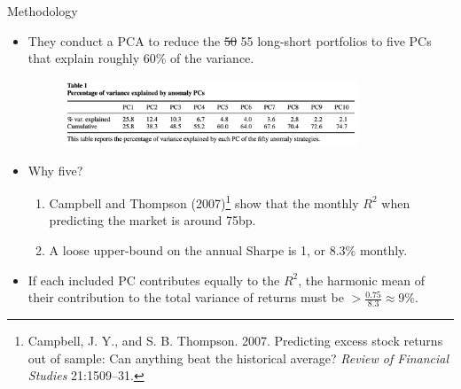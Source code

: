 \documentclass[dvipsnames,mathserif, handout]{beamer}
\begin{document}
{\begin{frame}{Methodology}
	\begin{itemize}
		\item They conduct a PCA to reduce the \sout{50} 55 long-short portfolios to five PCs that explain roughly 60\% of the variance.
		\begin{figure}[!ht]
		\centering
			\includegraphics[width=250pt]{Table1.pdf}
		\end{figure}
		\item Why five? 
		\begin{enumerate}
			\item Campbell and Thompson (2007)\footnote{\tiny Campbell, J. Y., and S. B. Thompson. 2007. Predicting excess stock returns out of sample: Can anything beat the historical average? \textit{Review of Financial Studies} 21:1509–31.} show that the monthly $R^2$ when predicting the market is around 75bp.
			\item A loose upper-bound on the annual Sharpe is 1, or 8.3\% monthly. 
		\end{enumerate}
		\item If each included PC contributes equally to the $R^2$, the harmonic mean of their contribution to the total variance of returns must be $> \frac{0.75}{8.3} \approx 9\%$.
	\end{itemize}
\end{frame} 

}
\end{document}
